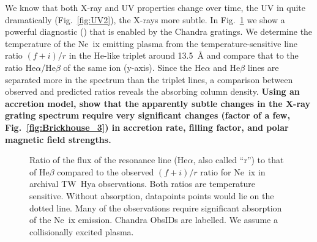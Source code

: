 \documentclass[letterpaper,11pt,twocolumn]{article}
\begin{document}
We know that both X-ray and UV properties change over time, the UV in
quite dramatically (Fig.~\ref{fig:UV2}), the X-rays more subtle. In
Fig.~\ref{fig:allspec} we show a powerful diagnostic
() that is enabled by the Chandra
gratings. We determine the temperature of the Ne~{\sc ix} emitting
plasma from the temperature-sensitive line ratio $(f+i)/r$ in the
He-like triplet around 13.5~\AA{} and compare that to the ratio
He$\alpha$/He$\beta$ of the same ion (y-axis). Since the He$\alpha$
and He$\beta$ lines are separated more in the spectrum than the
triplet lines, a comparison between observed and predicted ratios
reveals the absorbing column density. \textbf{Using an accretion
  model, \citet{2012ApJ...760L..21B} show that the apparently subtle
  changes in the X-ray grating spectrum require very significant
  changes (factor of a few, Fig.~\ref{fig:Brickhouse_3}) in accretion
  rate, filling factor, and polar magnetic field strengths. }

\begin{figure}[h!]
\centering
{}
\caption{Ratio of the flux of the resonance line (He$\alpha$, also
  called ``r'') to that of He$\beta$ compared to the observed
  $(f+i)/r$ ratio for Ne~{\sc ix} in archival TW~Hya
  observations. Both ratios are temperature sensitive.
Without absorption,
  datapoints points would lie on the dotted line.  Many of the
  observations require significant absorption of the Ne~{\sc ix}
  emission. Chandra ObsIDs are labelled. We assume a collisionally
  excited plasma.
\label{fig:allspec} }
\end{figure}
\end{document}
